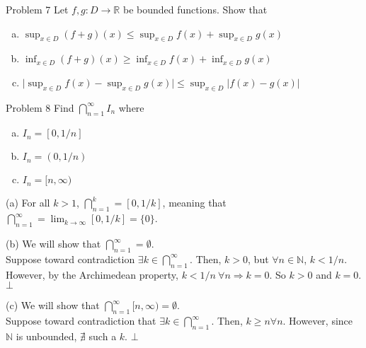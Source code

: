 \documentclass[10pt]{extarticle}
\newcommand{\N}{\mathbb{N}}
\newcommand{\R}{\mathbb{R}}
\begin{document}
  \begin{problem}{Problem 7}
    Let $f,g: D\rightarrow\R$ be bounded functions. Show that
    \begin{enumerate}[(a)]
      \item $\sup_{x\in D}(f+g)(x) \leq \sup_{x\in D}f(x) + \sup_{x\in D}g(x)$
      \item $\inf_{x\in D}(f+g)(x) \geq \inf_{x\in D}f(x) + \inf_{x\in D}g(x)$
      \item $\vert \sup_{x\in D}f(x) - \sup_{x\in D}g(x) \vert \leq \sup_{x\in D}\vert f(x) - g(x) \vert$
    \end{enumerate}
  \end{problem}
  \begin{problem}{Problem 8}
    Find $\bigcap_{n = 1}^{\infty} I_n$ where
    \begin{enumerate}[(a)]
      \item $I_n = [0,1/n]$
      \item $I_n = (0,1/n)$
      \item $I_n = [n,\infty)$
    \end{enumerate}
    \tcblower
    \begin{problem}{(a)}
      For all $k > 1$, $\bigcap_{n=1}^{k} = [0,1/k]$, meaning that $\bigcap_{n=1}^{\infty} = \lim_{k\rightarrow\infty}[0,1/k] = \{0\}$.
    \end{problem}
    \begin{problem}{(b)}
      We will show that $\bigcap_{n=1}^{\infty} = \emptyset$.\\

      Suppose toward contradiction $\exists k\in \bigcap_{n=1}^{\infty}$. Then, $k > 0$, but $\forall n\in \N$, $k < 1/n$. However, by the Archimedean property, $k < 1/n~\forall n \Rightarrow k=0$. So $k > 0$ and $k = 0$. $\bot$
    \end{problem}
    \begin{problem}{(c)}
      We will show that $\bigcap_{n=1}^{\infty} [n,\infty) = \emptyset$.\\

      Suppose toward contradiction that $\exists k \in \bigcap_{n=1}^{\infty}$. Then, $k \geq n \forall n$. However, since $\N$ is unbounded, $\nexists$ such a $k$. $\bot$
    \end{problem}
  \end{problem}
\end{document}
